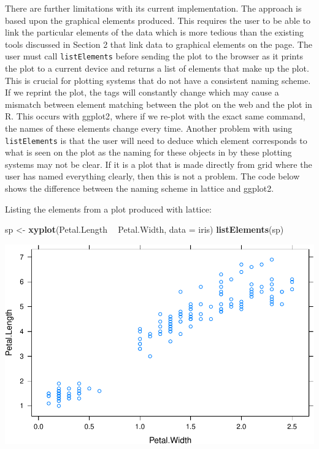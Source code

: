 \documentclass[11pt,]{report}
\newenvironment{Shaded}{\begin{snugshade}}{\end{snugshade}}
\newcommand{\KeywordTok}[1]{\textcolor[rgb]{0.13,0.29,0.53}{\textbf{#1}}}
\newcommand{\DataTypeTok}[1]{\textcolor[rgb]{0.13,0.29,0.53}{#1}}
\newcommand{\StringTok}[1]{\textcolor[rgb]{0.31,0.60,0.02}{#1}}
\newcommand{\OperatorTok}[1]{\textcolor[rgb]{0.81,0.36,0.00}{\textbf{#1}}}
\newcommand{\NormalTok}[1]{#1}
\begin{document}
There are further limitations with its current implementation. The
approach is based upon the graphical elements produced. This requires
the user to be able to link the particular elements of the data which is
more tedious than the existing tools discussed in Section 2 that link
data to graphical elements on the page. The user must call
\texttt{listElements} before sending the plot to the browser as it
prints the plot to a current device and returns a list of elements that
make up the plot. This is crucial for plotting systems that do not have
a consistent naming scheme. If we reprint the plot, the tags will
constantly change which may cause a mismatch between element matching
between the plot on the web and the plot in R. This occurs with
\textsf{ggplot2}, where if we re-plot with the exact same command, the
names of these elements change every time. Another problem with using
\texttt{listElements} is that the user will need to deduce which element
corresponds to what is seen on the plot as the naming for these objects
in by these plotting systems may not be clear. If it is a plot that is
made directly from \textsf{grid} where the user has named everything
clearly, then this is not a problem. The code below shows the difference
between the naming scheme in lattice and \textsf{ggplot2}.

Listing the elements from a plot produced with lattice:

\begin{Shaded}
\begin{Highlighting}[]
\NormalTok{sp <-}\StringTok{ }\KeywordTok{xyplot}\NormalTok{(Petal.Length }\OperatorTok{~}\StringTok{ }\NormalTok{Petal.Width, }\DataTypeTok{data =}\NormalTok{ iris)}
\KeywordTok{listElements}\NormalTok{(sp)}
\end{Highlighting}
\end{Shaded}

\begin{center}\includegraphics{figures/unnamed-chunk-90-1} \end{center}
\end{document}
